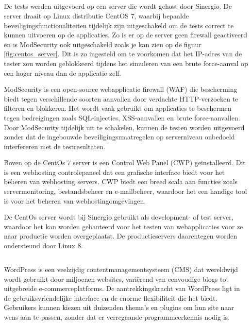 \subsection{}
De tests werden uitgevoerd op een server die wordt gehost door Sinergio. De server draait op Linux distributie CentOS 7, waarbij bepaalde 
beveiligingsfunctionaliteiten tijdelijk zijn uitgeschakeld om de tests correct te kunnen uitvoeren op de applicaties. Zo is er op de server 
geen firewall geactiveerd en is ModSecurity ook uitgeschakeld zoals je kan zien op de figuur \ref{fig:centos_server}. Dit is 
zo ingesteld om te voorkomen dat het IP-adres van de tester zou worden geblokkeerd tijdens het simuleren van een brute 
force-aanval op een hoger niveau dan de applicatie zelf.

ModSecurity is een open-source webapplicatie firewall (WAF) die bescherming biedt tegen verschillende soorten aanvallen door 
verdachte HTTP-verzoeken te filteren en blokkeren. Het wordt vaak gebruikt om applicaties te beschermen tegen bedreigingen 
zoals SQL-injecties, XSS-aanvallen en brute force-aanvallen. Door ModSecurity tijdelijk uit te schakelen, kunnen de testen 
worden uitgevoerd zonder dat de ingebouwde beveiligingsmaatregelen op serverniveau onbedoeld interfereren met de testresultaten.

Boven op de CentOs 7 server is een Control Web Panel (CWP) geïnstalleerd. Dit is een webhosting controlepaneel dat
een grafische interface biedt voor het beheren van webhosting servers. CWP biedt een breed scala aan functies zoals
servermonitoring, bestandsbeheer en e-mailbeheer, waardoor het een handige tool is voor het beheren van webhostingomgevingen.

De CentOs server wordt bij Sinergio gebruikt als development- of test server, waardoor het kan worden gehanteerd voor het 
testen van webapplicaties voor ze naar productie worden overgeplaatst. De productieservers daarentegen worden ondersteund 
door Linux 8.

\subsection{}
WordPress is een veelzijdig contentmanagementsysteem (CMS) dat wereldwijd wordt gebruikt door miljoenen websites, variërend van 
eenvoudige blogs tot uitgebreide e-commerceplatforms. De aantrekkingskracht van WordPress ligt in de gebruiksvriendelijke 
interface en de enorme flexibiliteit die het biedt. Gebruikers kunnen kiezen uit duizenden thema's en plugins om hun site 
naar wens aan te passen, zonder dat er verregaande programmeerkennis nodig is. 

